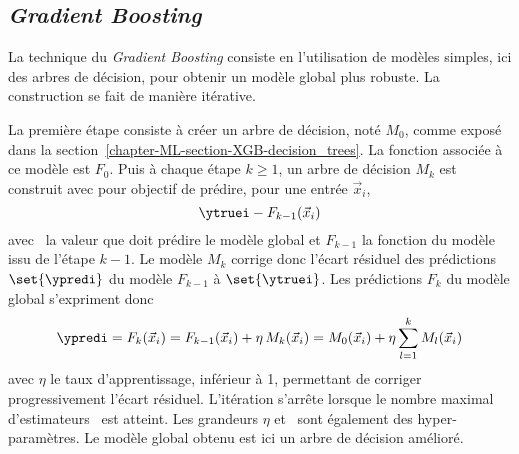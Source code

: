 \subsection{\emph{Gradient Boosting}}\label{chapter-ML-section-XGB-grad_boost}
La technique du \emph{Gradient Boosting} consiste en
l'utilisation de modèles simples,
ici des arbres de décision,
pour obtenir un modèle global plus robuste.
La construction se fait de manière itérative.
\par
La première étape consiste à créer un arbre de décision, noté $M_0$, comme exposé dans la section~\ref{chapter-ML-section-XGB-decision_trees}.
La fonction associée à ce modèle est $F_0$.
Puis à chaque étape $k\geq1$,
un arbre de décision $M_k$ est construit avec pour objectif de prédire,
pour une entrée $\vec{x}_i$,
\begin{equation}
\ytruei - F_{k-1}(\vec{x}_i)
\end{equation}
avec
\ytruei\ la valeur que doit prédire le modèle global %
et
$F_{k-1}$ la fonction du modèle issu de l'étape ${k-1}$.
Le modèle $M_k$ corrige donc l'écart résiduel des prédictions $\set{\ypredi}$ du modèle $F_{k-1}$ à $\set{\ytruei}$.
Les prédictions $F_k$ du modèle global s'expriment donc
\begin{equation}
\ypredi
=
F_k(\vec{x}_i)
=
F_{k-1}(\vec{x}_i) + \eta\,M_k(\vec{x}_i)
=
M_0(\vec{x}_i) + \eta \sum_{l=1}^{k} M_l(\vec{x}_i)
\end{equation}
avec
$\eta$ le taux d'apprentissage, inférieur à 1, permettant de corriger progressivement l'écart résiduel.
L'itération s'arrête lorsque le nombre maximal d'estimateurs \Nestimators\ est atteint.
Les grandeurs $\eta$ et \Nestimators\ sont également des hyper-paramètres.
Le modèle global obtenu est ici un arbre de décision amélioré.
